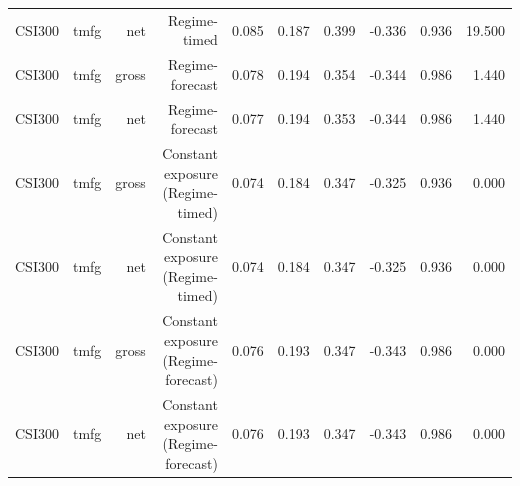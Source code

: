 \begin{tabular}{lrrrrrrrrr}
CSI300 & tmfg & net & Regime-timed & 0.085 & 0.187 & 0.399 & -0.336 & 0.936 & 19.500 \\
CSI300 & tmfg & gross & Regime-forecast & 0.078 & 0.194 & 0.354 & -0.344 & 0.986 & 1.440 \\
CSI300 & tmfg & net & Regime-forecast & 0.077 & 0.194 & 0.353 & -0.344 & 0.986 & 1.440 \\
CSI300 & tmfg & gross & Constant exposure (Regime-timed) & 0.074 & 0.184 & 0.347 & -0.325 & 0.936 & 0.000 \\
CSI300 & tmfg & net & Constant exposure (Regime-timed) & 0.074 & 0.184 & 0.347 & -0.325 & 0.936 & 0.000 \\
CSI300 & tmfg & gross & Constant exposure (Regime-forecast) & 0.076 & 0.193 & 0.347 & -0.343 & 0.986 & 0.000 \\
CSI300 & tmfg & net & Constant exposure (Regime-forecast) & 0.076 & 0.193 & 0.347 & -0.343 & 0.986 & 0.000 \\
\bottomrule
\end{tabular}
